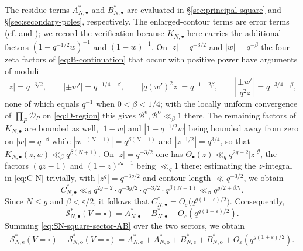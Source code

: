 \documentclass[a4paper,reqno]{amsart}
\numberwithin{equation}{section}
\theoremstyle{remark}
\theoremstyle{definition}
\begin{document}
The residue terms $A_{N,\bullet}^{*}$ and $B_{N,\bullet}^{*}$ are evaluated
in \S\ref{sec:principal-square} and \S\ref{sec:secondary-poles},
respectively. The enlarged-contour terms are error terms
(cf. \cite[(3.22)]{Ju20} and \cite[(5.8)~and~(5.12)]{AM-21}); we record the
verification because $K_{N,\bullet}$ here carries the additional factors
$(1-q^{-1/2}w)^{-1}$ and $(1-w)^{-1}$. On $|z|=q^{-3/2}$ and
$|w|=q^{-\beta}$ the four zeta factors of \eqref{eq:B-continuation} that
occur with positive power have arguments of moduli
$$
|z|=q^{-3/2},
\qquad
|\pm w'|=q^{-1/4-\beta},
\qquad
\bigl|q(w')^2z\bigr|=q^{-1-2\beta},
\qquad
\left|\frac{\pm w'}{q^2z}\right|=q^{-3/4-\beta},
$$
none of which equals $q^{-1}$ when $0<\beta<1/4$; with the locally uniform
convergence of $\prod_P\mathcal D_P$ on \eqref{eq:D-region} this gives
$\mathcal B^{\mathrm e},\mathcal B^{\mathrm o}\ll_\beta1$ there. The
remaining factors of $K_{N,\bullet}$ are bounded as well, $|1-w|$ and
$|1-q^{-1/2}w|$ being bounded away from zero on $|w|=q^{-\beta}$ while
$|w^{-(N+1)}|=q^{\beta(N+1)}$ and $|z^{-1/2}|=q^{3/4}$, so that
$K_{N,\bullet}(z,w)\ll_\beta q^{\beta(N+1)}$. On $|z|=q^{-3/2}$ one has
$\Theta_\bullet(z)\ll_q q^{2g+2}|z|^g$, the factors $(qz-1)$ and
$(1-z)^{\nu_\bullet-1}$ being $\ll_q1$ there; estimating the
$z$-integral in \eqref{eq:C-N} trivially, with $|z^g|=q^{-3g/2}$ and contour
length $\ll q^{-3/2}$, we obtain
$$
C_{N,\bullet}^{*}
\ll_\beta
q^{2g+2}\cdot q^{-3g/2}\cdot q^{-3/2}\cdot q^{\beta(N+1)}
\ll_\beta
q^{g/2+\beta N}.
$$
Since $N\le g$ and $\beta<\varepsilon/2$, it follows that
$C_{N,\bullet}^{*}=O_\varepsilon\bigl(q^{g(1+\varepsilon)/2}\bigr)$.
Consequently,
\begin{equation}\label{eq:SN-square-sector-AB}
\mathcal S_{N,\bullet}^{*}(V=\square)
=
A_{N,\bullet}^{*}
+
B_{N,\bullet}^{*}
+
O_\varepsilon\!\left(q^{g(1+\varepsilon)/2}\right).
\end{equation}
Summing \eqref{eq:SN-square-sector-AB} over the two sectors, we obtain
\begin{equation}\label{eq:SN-square-AB}
\begin{aligned}
\mathcal S_{N,\mathrm e}^{*}(V=\square)
+
\mathcal S_{N,\mathrm o}^{*}(V=\square)
=
A_{N,\mathrm e}^{*}
+
A_{N,\mathrm o}^{*}
+
B_{N,\mathrm e}^{*}
+
B_{N,\mathrm o}^{*}
+
O_\varepsilon\!\left(q^{g(1+\varepsilon)/2}\right).
\end{aligned}
\end{equation}

\end{document}

